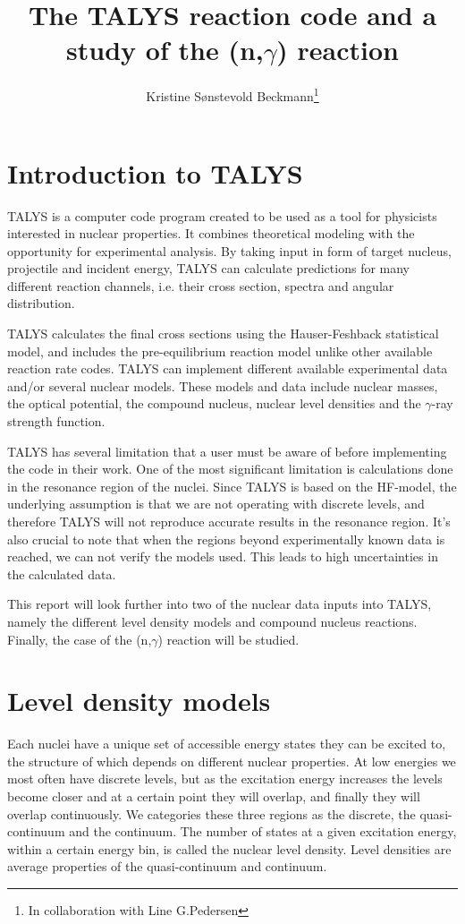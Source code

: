 \documentclass[a4paper,english]{article}
\title{The TALYS reaction code and a study of the \ce{^{153}Sm}(n,$\gamma$)\ce{^{154}Sm} reaction}
\author{Kristine Sønstevold Beckmann\footnote{In collaboration with Line G.Pedersen}}
\begin{document}
\maketitle
\section{Introduction to TALYS}
TALYS is a computer code program created to be used as a tool for physicists interested in nuclear properties. It combines theoretical modeling with the opportunity for experimental analysis.\cite{manual} By taking input in form of target nucleus, projectile and incident energy, TALYS can calculate predictions for many different reaction channels, i.e. their cross section, spectra and angular distribution. 

TALYS calculates the final cross sections using the Hauser-Feshback statistical model\cite{Goriely2008}, and includes the pre-equilibrium reaction model unlike other available reaction rate codes. TALYS can implement different available experimental data and/or several nuclear models. These models and data include nuclear masses, the optical potential, the compound nucleus, nuclear level densities and the $\gamma$-ray strength function. 

TALYS has several limitation that a user must be aware of before implementing the code in their work. One of the most significant limitation is calculations done in the resonance region of the nuclei. Since TALYS is based on the HF-model, the underlying assumption is that we are not operating with discrete levels, and therefore TALYS will not reproduce accurate results in the resonance region. It's also crucial to note that when the regions beyond experimentally known data is reached, we can not verify the models used. This leads to high uncertainties in the calculated data.

This report will look further into two of the nuclear data inputs into TALYS, namely the different level density models and compound nucleus reactions. Finally, the case of the (n,$\gamma$) reaction will be studied.
\section{Level density models}
Each nuclei have a unique set of accessible energy states they can be excited to, the structure of which depends on different nuclear properties. At low energies we most often have discrete levels, but as the excitation energy increases the levels become closer and at a certain point they will overlap, and finally they will overlap continuously. We categories these three regions as the discrete, the quasi-continuum and the continuum. The number of states at a given excitation energy, within a certain energy bin, is called the nuclear level density. Level densities are average properties of the quasi-continuum and continuum.
\end{document}

